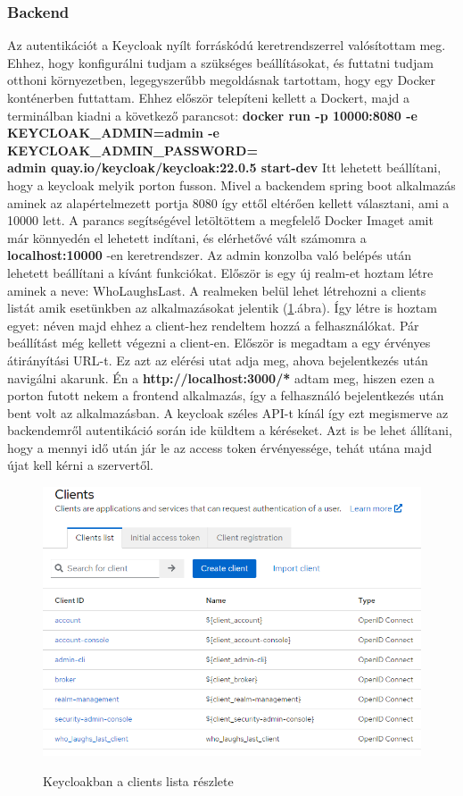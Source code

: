 \documentclass[a4paper,twoside]{article}
\begin{document}
\subsubsection{Backend}
Az autentikációt a Keycloak nyílt forráskódú keretrendszerrel valósítottam meg. Ehhez, hogy konfigurálni tudjam a 
szükséges beállításokat, és futtatni tudjam otthoni környezetben, legegyszerűbb megoldásnak tartottam, hogy egy Docker konténerben 
futtattam. Ehhez először telepíteni kellett a Dockert, majd a terminálban kiadni a következő parancsot: 
\textbf{docker run -p 10000:8080 -e KEYCLOAK\_ADMIN=admin -e KEYCLOAK\_ADMIN\_PASSWORD=\\admin quay.io/keycloak/keycloak:22.0.5 start-dev}
Itt lehetett beállítani, hogy a keycloak melyik porton fusson. Mivel a backendem spring boot alkalmazás aminek az alapértelmezett portja 8080 így 
ettől eltérően kellett választani, ami a 10000 lett. A parancs segítségével letöltöttem a megfelelő Docker Imaget amit már könnyedén el lehetett indítani,
és elérhetővé vált számomra a \textbf{localhost:10000} -en keretrendszer. Az admin konzolba való belépés után lehetett beállítani a kívánt funkciókat. 
Először is egy új realm-et hoztam létre aminek a neve: WhoLaughsLast. A realmeken belül lehet létrehozni a clients listát amik esetünkben az alkalmazásokat jelentik (\ref{keycloak}.ábra). Így létre is hoztam egyet:  néven majd ehhez a client-hez rendeltem hozzá a felhasználókat. 
Pár beállítást még kellett végezni a client-en. Először is megadtam a egy érvényes átirányítási URL-t. Ez azt az elérési utat adja meg, ahova bejelentkezés után navigálni akarunk. Én 
a \textbf{http://localhost:3000/*} adtam meg, hiszen ezen a porton futott nekem a frontend alkalmazás, így a felhasználó bejelentkezés után bent volt az alkalmazásban. A keycloak
széles API-t kínál így ezt megismerve az backendemről autentikáció során ide küldtem a kéréseket. Azt is be lehet állítani, hogy a mennyi idő után jár le az access token érvényessége, tehát utána majd újat kell kérni a szervertől. 
\begin{figure}
	\caption{Keycloakban a clients lista részlete}
	\centering
	\includegraphics[scale=0.5]{keycloak-cients}
	\label{keycloak}
\end{figure}
\FloatBarrier
\end{document}
